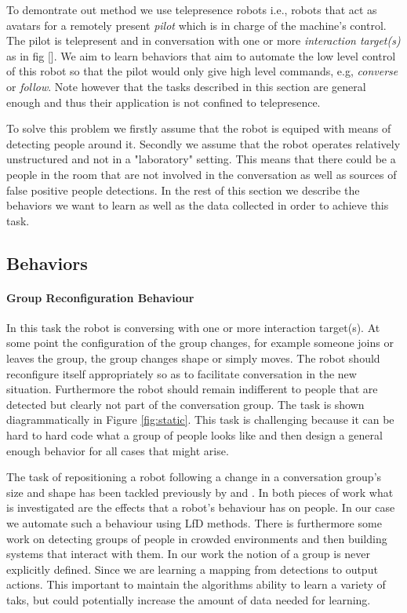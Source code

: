 \documentclass[letterpaper, 10 pt, conference]{ieeeconf}
\begin{document}
To demontrate out method we use telepresence robots  i.e., robots that act as avatars for a remotely present \emph{pilot} which is in charge of the machine's control. The pilot is telepresent and in conversation with one or more \emph{interaction target(s)} as in fig []. We aim to learn behaviors  that aim to automate the low level control of this robot so that the pilot would only give high level commands, e.g, \emph{converse} or \emph{follow}. Note however that the tasks described in this section are general enough and thus their application is not confined to telepresence. 


To solve this problem we firstly assume that the robot is equiped with means of detecting people around it. Secondly we assume that the robot operates relatively unstructured and not in a "laboratory" setting. This means that there could be a people in the room that are not involved in the conversation as well as sources of false positive people detections. In the rest of this section we describe the behaviors we want to learn as well as the data collected in order to achieve this task. 

\subsection{Behaviors \label{subsec:behaviors}}

\paragraph{Group Reconfiguration Behaviour} In this task the robot is conversing with one or more interaction target(s). At some point the configuration of the group changes, for example someone joins or leaves the group, the group changes shape or simply moves. The robot should reconfigure itself appropriately so as to facilitate conversation in the new situation. Furthermore the robot should remain indifferent to people that are detected but clearly not part of the conversation group. The task is shown diagrammatically in Figure \ref{fig:static}. This task is challenging because it can be hard to hard code what a group of people looks like and then design a general enough behavior for all cases that might arise.

The task of repositioning a robot following a change in a conversation group's size and shape has been tackled previously by \cite{kuzuoka2010reconfiguring} and \cite{vroon2015dynamics}. In both pieces of work what is investigated are the effects that a robot's behaviour has on people. In our case we automate such a behaviour using LfD methods.  There is furthermore some work on detecting groups of people in crowded environments \cite{lau2010multi} and then building systems that interact with them. In our work the notion of a group is never explicitly defined. Since we are learning a mapping from detections to output actions. This important to maintain the algorithms ability to learn a variety of taks, but could potentially increase the amount of data needed for learning.
\end{document}
